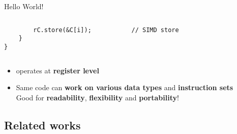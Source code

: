 \begin{frame}[fragile]{Hello World!}
\begin{columns}[t]
\begin{column}[T]{8.6cm}
\begin{overprint}
\begin{verbatim}
		rC.store(&C[i]);           // SIMD store
	}
}
      \end{verbatim}
      \end{overprint}
    \end{column}
  \end{columns}
  \pause
  \begin{itemize}
    \item \MIPP operates at \textbf{register level}
    \pause
    \item Same code can \textbf{work on various data types} and \textbf{instruction sets}
    \pause
    	\\\vspace*{.5em}
      {\color{bleuUni}\Large\MVRightarrow} Good for \textbf{readability}, \textbf{flexibility} and \textbf{portability}!
  \end{itemize}
\end{frame}

\subsection[Related works]{Related works}

